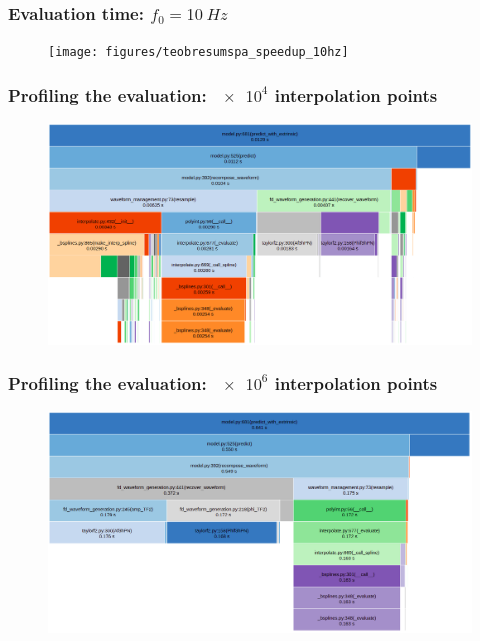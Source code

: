 \documentclass{beamer}
\begin{document}
\begin{frame}
    \frametitle{Evaluation time: \(f_0 = \SI{10}{Hz}\)}
    
    \begin{figure}[ht]
    \centering
    \texttt{[image: figures/teobresumspa\_speedup\_10hz]}
    \label{fig:teobresumspa_speedup}
    \end{figure}
\end{frame}

\begin{frame}
    \frametitle{Profiling the evaluation: \(\num{e4}\) interpolation points}
    \begin{figure}[ht]
    \centering
    \includegraphics[width=\textwidth]{figures/predict_profile_fast}
    \label{fig:predict_profile_fast}
    \end{figure}
\end{frame}

\begin{frame}
    \frametitle{Profiling the evaluation: \(\num{e6}\) interpolation points}
    \begin{figure}[ht]
    \centering
    \includegraphics[width=\textwidth]{figures/predict_profile_slow}
    \label{fig:predict_profile_slow}
    \end{figure}
\end{frame}
\end{document}
